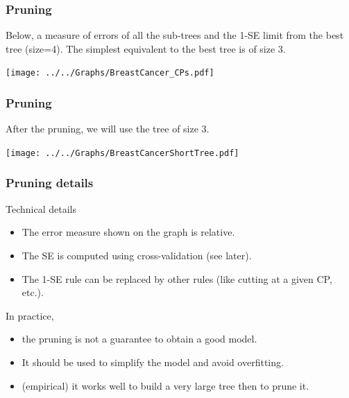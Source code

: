 \begin{frame}
\frametitle{Pruning}
Below, a measure of errors of all the sub-trees and the 1-SE limit from the best tree (size=4). The simplest equivalent to the best tree is of size 3.
\begin{center}
\texttt{[image: ../../Graphs/BreastCancer\_CPs.pdf]}
\end{center}
\end{frame}
\begin{frame}
\frametitle{Pruning}
After the pruning, we will use the tree of size 3.
\begin{center}
\texttt{[image: ../../Graphs/BreastCancerShortTree.pdf]}
\end{center}
\end{frame}
\begin{frame}
\frametitle{Pruning details}
Technical details
\begin{itemize}
\item The error measure shown on the graph is relative.
\item The SE is computed using cross-validation (see later).
\item The 1-SE rule can be replaced by other rules (like cutting at a given CP, etc.). 
\end{itemize}
In practice, 
\begin{itemize}
\item the pruning is not a guarantee to obtain a good model. 
\item It should be used to simplify the model and avoid overfitting.
\item (empirical) it works well to build a very large tree then to prune it.
\end{itemize}
\end{frame}
